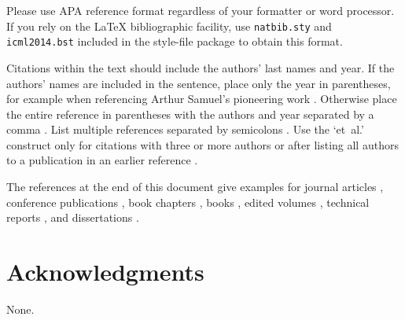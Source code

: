 \documentclass{article}
\begin{document}
Please use APA reference format regardless of your formatter
or word processor. If you rely on the \LaTeX\/ bibliographic 
facility, use {\tt natbib.sty} and {\tt icml2014.bst} 
included in the style-file package to obtain this format.

Citations within the text should include the authors' last names and
year. If the authors' names are included in the sentence, place only
the year in parentheses, for example when referencing Arthur Samuel's
pioneering work . Otherwise place the entire
reference in parentheses with the authors and year separated by a
comma \cite{Samuel59}. List multiple references separated by
semicolons \cite{kearns89,Samuel59,mitchell80}. Use the `et~al.'
construct only for citations with three or more authors or after
listing all authors to a publication in an earlier reference \cite{MachineLearningI}.

The references at the end of this document give examples for journal
articles \cite{Samuel59}, conference publications \cite{langley00}, book chapters \cite{Newell81}, books \cite{DudaHart2nd}, edited volumes \cite{MachineLearningI}, 
technical reports \cite{mitchell80}, and dissertations \cite{kearns89}. 


 
\section*{Acknowledgments} 
  None.



\end{document}
